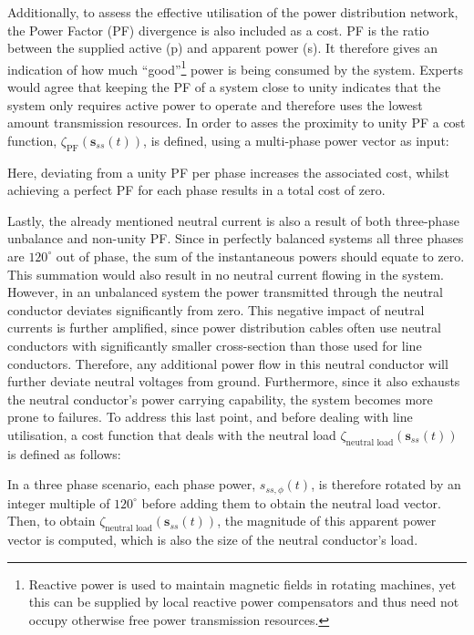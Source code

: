 Additionally, to assess the effective utilisation of the power distribution network, the Power Factor (PF) divergence is also included as a cost.
PF is the ratio between the supplied active (p) and apparent power (s).
It therefore gives an indication of how much ``good''\footnote[1]{Reactive power is used to maintain magnetic fields in rotating machines, yet this can be supplied by local reactive power compensators and thus need not occupy otherwise free power transmission resources.} power is being consumed by the system.
Experts would agree that keeping the PF of a system close to unity indicates that the system only requires active power to operate and therefore uses the lowest amount transmission resources.
In order to asses the proximity to unity PF a cost function, $\zeta_\text{PF}(\textbf{s}_{ss}(t))$, is defined, using a multi-phase power vector as input:



Here, deviating from a unity PF per phase increases the associated cost, whilst achieving a perfect PF for each phase results in a total cost of zero.


Lastly, the already mentioned neutral current is also a result of both three-phase unbalance and non-unity PF.
Since in perfectly balanced systems all three phases are $120^\circ$ out of phase, the sum of the instantaneous powers should equate to zero.
This summation would also result in no neutral current flowing in the system.
However, in an unbalanced system the power transmitted through the neutral conductor deviates significantly from zero.
This negative impact of neutral currents is further amplified, since power distribution cables often use neutral conductors with significantly smaller cross-section than those used for line conductors.
Therefore, any additional power flow in this neutral conductor will further deviate neutral voltages from ground.
Furthermore, since it also exhausts the neutral conductor's power carrying capability, the system becomes more prone to failures.
To address this last point, and before dealing with line utilisation, a cost function that deals with the neutral load $\zeta_\text{neutral load}(\textbf{s}_{ss}(t))$ is defined as follows:



In a three phase scenario, each phase power, $s_{ss,\phi}(t)$, is therefore rotated by an integer multiple of $120^\circ$ before adding them to obtain the neutral load vector.
Then, to obtain $\zeta_\text{neutral load}(\textbf{s}_{ss}(t))$, the magnitude of this apparent power vector is computed, which is also the size of the neutral conductor's load.

